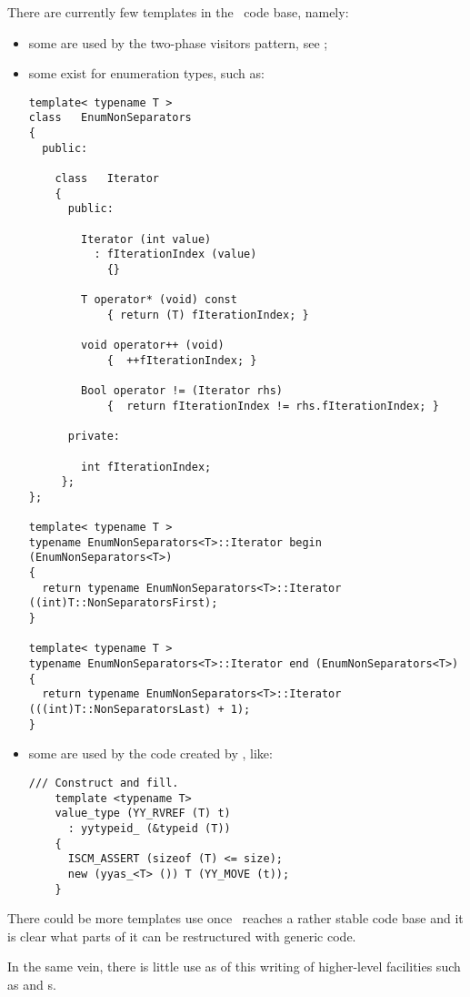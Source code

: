 There are currently few templates in the \mf\ code base, namely:
\begin{itemize}
\item some are used by the two-phase visitors pattern, see ;

\item some exist for enumeration types, such as:
\begin{lstlisting}[language=CPlusPlus]
template< typename T >
class   EnumNonSeparators
{
  public:

    class   Iterator
    {
      public:

        Iterator (int value)
          : fIterationIndex (value)
            {}

        T operator* (void) const
            { return (T) fIterationIndex; }

        void operator++ (void)
            {  ++fIterationIndex; }

        Bool operator != (Iterator rhs)
            {  return fIterationIndex != rhs.fIterationIndex; }

      private:

        int fIterationIndex;
     };
};

template< typename T >
typename EnumNonSeparators<T>::Iterator begin (EnumNonSeparators<T>)
{
  return typename EnumNonSeparators<T>::Iterator ((int)T::NonSeparatorsFirst);
}

template< typename T >
typename EnumNonSeparators<T>::Iterator end (EnumNonSeparators<T>)
{
  return typename EnumNonSeparators<T>::Iterator (((int)T::NonSeparatorsLast) + 1);
}
\end{lstlisting}


\item some are used by the code created by \bison, like:
\begin{lstlisting}[language=CPlusPlus]
    /// Construct and fill.
    template <typename T>
    value_type (YY_RVREF (T) t)
      : yytypeid_ (&typeid (T))
    {
      ISCM_ASSERT (sizeof (T) <= size);
      new (yyas_<T> ()) T (YY_MOVE (t));
    }
\end{lstlisting}

\end{itemize}

There could be more templates use once \mf\ reaches a rather stable code base and it is clear what parts of it can be restructured with generic code.

In the same vein, there is little use as of this writing of higher-level facilities such as  and s.

